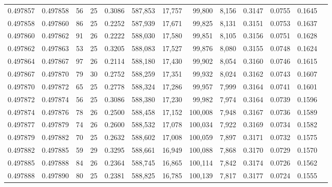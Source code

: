 \begin{tabular}{rrrrrrrrrrrrr}
0.497857 & 0.497858 &  56 &  25 &                                     0.3086 & 587,853 &  17,757 &  99,800 &   8,156 & 0.3147 & 0.0755 & 0.1645 \\
0.497858 & 0.497860 &  86 &  25 &                                     0.2252 & 587,939 &  17,671 &  99,825 &   8,131 & 0.3151 & 0.0753 & 0.1637 \\
0.497860 & 0.497862 &  91 &  26 &                                     0.2222 & 588,030 &  17,580 &  99,851 &   8,105 & 0.3156 & 0.0751 & 0.1628 \\
0.497862 & 0.497863 &  53 &  25 &                                     0.3205 & 588,083 &  17,527 &  99,876 &   8,080 & 0.3155 & 0.0748 & 0.1624 \\
0.497864 & 0.497867 &  97 &  26 &                                     0.2114 & 588,180 &  17,430 &  99,902 &   8,054 & 0.3160 & 0.0746 & 0.1615 \\
0.497867 & 0.497870 &  79 &  30 &                                     0.2752 & 588,259 &  17,351 &  99,932 &   8,024 & 0.3162 & 0.0743 & 0.1607 \\
0.497870 & 0.497872 &  65 &  25 &                                     0.2778 & 588,324 &  17,286 &  99,957 &   7,999 & 0.3164 & 0.0741 & 0.1601 \\
0.497872 & 0.497874 &  56 &  25 &                                     0.3086 & 588,380 &  17,230 &  99,982 &   7,974 & 0.3164 & 0.0739 & 0.1596 \\
0.497874 & 0.497876 &  78 &  26 &                                     0.2500 & 588,458 &  17,152 & 100,008 &   7,948 & 0.3167 & 0.0736 & 0.1589 \\
0.497877 & 0.497879 &  74 &  26 &                                     0.2600 & 588,532 &  17,078 & 100,034 &   7,922 & 0.3169 & 0.0734 & 0.1582 \\
0.497879 & 0.497882 &  70 &  25 &                                     0.2632 & 588,602 &  17,008 & 100,059 &   7,897 & 0.3171 & 0.0732 & 0.1575 \\
0.497882 & 0.497885 &  59 &  29 &                                     0.3295 & 588,661 &  16,949 & 100,088 &   7,868 & 0.3170 & 0.0729 & 0.1570 \\
0.497885 & 0.497888 &  84 &  26 &                                     0.2364 & 588,745 &  16,865 & 100,114 &   7,842 & 0.3174 & 0.0726 & 0.1562 \\
0.497888 & 0.497890 &  80 &  25 &                                     0.2381 & 588,825 &  16,785 & 100,139 &   7,817 & 0.3177 & 0.0724 & 0.1555 \\

\end{tabular}
